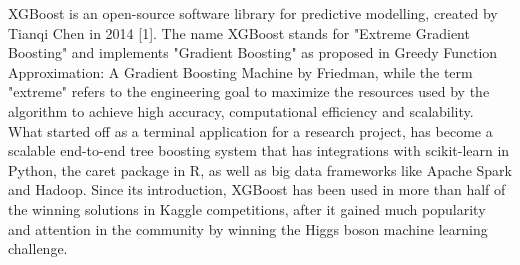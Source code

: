 XGBoost is an open-source software library for predictive modelling, created by Tianqi Chen in 2014 [1]. The name XGBoost stands for "Extreme Gradient Boosting" and implements "Gradient Boosting" as proposed in Greedy Function Approximation: A Gradient Boosting Machine by Friedman, while the term "extreme" refers to the engineering goal to maximize the resources used by the algorithm to achieve high accuracy, computational efficiency and scalability. What started off as a terminal application for a research project, has become a scalable end-to-end tree boosting system that has integrations with scikit-learn in Python, the caret package in R, as well as big data frameworks like Apache Spark and Hadoop. Since its introduction, XGBoost has been used in more than half of the winning solutions in Kaggle competitions, after it gained much popularity and attention in the community by winning the Higgs boson machine learning challenge.
